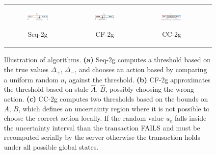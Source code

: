 \documentclass{article} %
\newcommand{\hogwild}{CF-2g}
\newcommand{\occ}{CC-2g}
\newcommand{\seqalg}{Seq-2g}
\begin{document}
\begin{figure}[t]
\begin{multicols}{2}
\begin{minipage}{0.47\textwidth}
    \end{minipage}



  \end{multicols}
  \label{fig:submax}
\end{figure}



\begin{figure}[t]
  \centering
  \begin{tabular}{cccc}
    \begin{subfigure}[h]{0.30\textwidth}
      \centering
      \includegraphics[width=100pt]{images/probvec_seq.pdf}
      \label{fig:probvecseq}
      \caption{\footnotesize\seqalg{}}
    \end{subfigure} &
    \begin{subfigure}[h]{0.30\textwidth}
      \centering
      \includegraphics[width=100pt]{images/probvec_CF.pdf}
      \label{fig:probveccf}
      \caption{\footnotesize\hogwild{}}
    \end{subfigure} &
    \begin{subfigure}[h]{0.30\textwidth}
      \centering
      \includegraphics[width=100pt]{images/probvec_CC.pdf}
      \label{fig:probveccc}
      \caption{\footnotesize\occ{}}
    \end{subfigure}
  \end{tabular}
  \caption{\footnotesize Illustration of algorithms.
  \textbf{(a)} \seqalg{} computes a threshold based on the true values $\Delta_+$, $\Delta_-$, and chooses an action based by comparing a uniform random $u_i$ against the threshold.
  \textbf{(b)} \hogwild{} approximates the threshold based on stale $\hat{A}$, $\hat{B}$, possibly choosing the wrong action.
  \textbf{(c)} \occ{} computes two thresholds based on the bounds on $A$, $B$, which defines an uncertainty region where it is not possible to choose the correct action locally.  If the random value $u_e$ falls inside the uncertainty interval than the transaction FAILS and must be recomputed serially by the server otherwise the transaction holds under all possible global states. %
  }
\end{figure}
\end{document}
